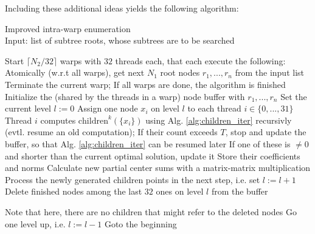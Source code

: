 \documentclass{scrartcl}
\begin{document}
    Including these additional ideas yields the following algorithm:
    \begin{algorithm}[H]
        \caption{Improved intra-warp enumeration\label{alg:warp_enum_complex}\\Input: list of subtree roots, whose subtrees are to be searched}
        \begin{algorithmic}
            \STATE Start $\lceil N_2 / 32 \rceil$ warps with $32$ threads each, that each execute the following:
            \STATE Atomically (w.r.t all warps), get next $N_1$ root nodes $r_1, ..., r_n$ from the input list
                \STATE Terminate the current warp; If all warps are done, the algorithm is finished
            \ENDIF
            \STATE Initialize the (shared by the threads in a warp) node buffer with $r_1, ..., r_n$
            \STATE Set the current level $l := 0$
                    \STATE Assign one node $x_i$ on level $l$ to each thread $i \in \{0, ..., 31\}$
                    \STATE Thread $i$ computes $\mathrm{children}^k(\{x_i\})$ using Alg. \ref{alg:children_iter} recursivly (evtl. resume an old computation);
                    If their count exceeds $T$, stop and update the buffer, so that Alg. \ref{alg:children_iter} can be resumed later
                        \STATE If one of these is $\neq 0$ and shorter than the current optimal solution, update it
                    \ELSE
                        \STATE Store their coefficients and norms
                        \STATE Calculate new partial center sums with a matrix-matrix multiplication
                    \ENDIF
                \ENDWHILE
                    \STATE Process the newly generated children points in the next step, i.e. set $l := l + 1$
                \ELSE
                    \STATE Delete finished nodes among the last $32$ ones on level $l$ from the buffer

                    Note that here, there are no children that might refer to the deleted nodes
                        \STATE Go one level up, i.e. $l := l - 1$
                    \ENDIF
                \ENDIF
            \ENDWHILE
            \STATE Goto the beginning
        \end{algorithmic}
    \end{algorithm}
\end{document}
